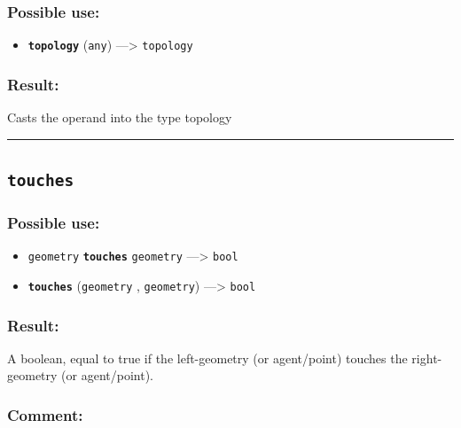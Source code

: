 \documentclass[]{book}
\providecommand{\tightlist}{%
  \setlength{\itemsep}{0pt}\setlength{\parskip}{0pt}}
\theoremstyle{definition}
\theoremstyle{definition}
\theoremstyle{definition}
\theoremstyle{remark}
\begin{document}
\subsubsection{Possible use:}\label{possible-use-526}

\begin{itemize}
\tightlist
\item
  \textbf{\texttt{topology}} (\texttt{any}) ---\textgreater{}
  \texttt{topology}
\end{itemize}

\subsubsection{Result:}\label{result-508}

Casts the operand into the type topology

\begin{center}\rule{0.5\linewidth}{\linethickness}\end{center}

\subsection{\texorpdfstring{\texttt{touches}}{touches}}\label{touches}

\subsubsection{Possible use:}\label{possible-use-527}

\begin{itemize}
\tightlist
\item
  \texttt{geometry} \textbf{\texttt{touches}} \texttt{geometry}
  ---\textgreater{} \texttt{bool}
\item
  \textbf{\texttt{touches}} (\texttt{geometry} , \texttt{geometry})
  ---\textgreater{} \texttt{bool}
\end{itemize}

\subsubsection{Result:}\label{result-509}

A boolean, equal to true if the left-geometry (or agent/point) touches
the right-geometry (or agent/point).

\subsubsection{Comment:}\label{comment-100}
\end{document}
